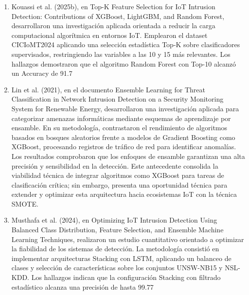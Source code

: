 \begin{enumerate}
\item Kouassi et al. (2025b), en Top-K Feature Selection for IoT Intrusion Detection: Contributions of XGBoost, LightGBM, and Random Forest, desarrollaron una investigación aplicada orientada a reducir la carga computacional algorítmica en entornos IoT. Emplearon el dataset CICIoMT2024 aplicando una selección estadística Top-K sobre clasificadores supervisados, restringiendo las variables a las 10 y 15 más relevantes. Los hallazgos demostraron que el algoritmo Random Forest con Top-10 alcanzó un Accuracy de 91.7%

\item Lin et al. (2021), en el documento Ensemble Learning for Threat Classification in Network Intrusion Detection on a Security Monitoring System for Renewable Energy, desarrollaron una investigación aplicada para categorizar amenazas informáticas mediante esquemas de aprendizaje por ensamble. En su metodología, contrastaron el rendimiento de algoritmos basados en bosques aleatorios frente a modelos de Gradient Boosting como XGBoost, procesando registros de tráfico de red para identificar anomalías. Los resultados comprobaron que los enfoques de ensamble garantizan una alta precisión y sensibilidad en la detección. Este antecedente consolida la viabilidad técnica de integrar algoritmos como XGBoost para tareas de clasificación crítica; sin embargo, presenta una oportunidad técnica para extender y optimizar esta arquitectura hacia ecosistemas IoT con la técnica SMOTE.

\item Musthafa et al. (2024), en Optimizing IoT Intrusion Detection Using Balanced Class Distribution, Feature Selection, and Ensemble Machine Learning Techniques, realizaron un estudio cuantitativo orientado a optimizar la fiabilidad de los sistemas de detección. La metodología consistió en implementar arquitecturas Stacking con LSTM, aplicando un balanceo de clases y selección de características sobre los conjuntos UNSW-NB15 y NSL-KDD. Los hallazgos indican que la configuración Stacking con filtrado estadístico alcanza una precisión de hasta 99.77%


\end{enumerate}
